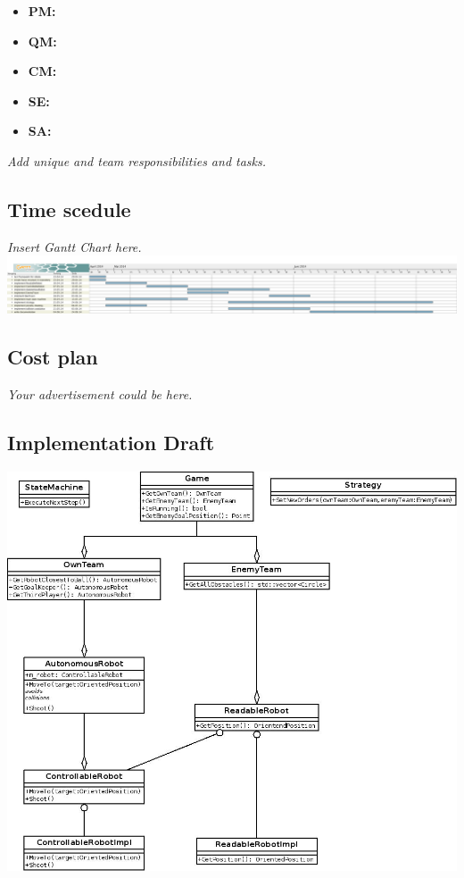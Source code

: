 \documentclass[12pt]{article}
\begin{document}
\begin{itemize}
	\item \textbf{PM:}  
	\item \textbf{QM:} 
	\item \textbf{CM:} 
	\item \textbf{SE:} 
	\item \textbf{SA:} 
\end{itemize}
\textit{Add unique and team responsibilities and tasks.}

\subsection{Time scedule}
\textit{Insert Gantt Chart here.}\\
\includegraphics[width=\textwidth]{../ganttchart.png}

\subsection{Cost plan}
\textit{Your advertisement could be here.}

\subsection{Implementation Draft}
\includegraphics[width=\textwidth]{../architecture.jpeg}
\end{document}
